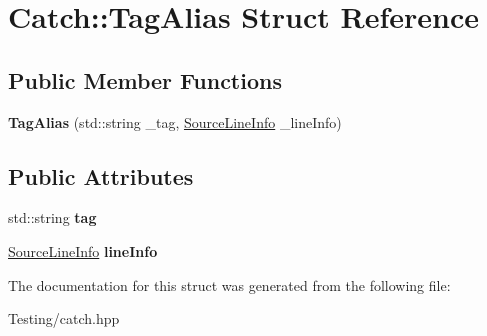 \hypertarget{struct_catch_1_1_tag_alias}{\section{Catch\-:\-:Tag\-Alias Struct Reference}
\label{struct_catch_1_1_tag_alias}
}
\subsection*{Public Member Functions}
\begin{DoxyCompactItemize}
\item 
\hypertarget{struct_catch_1_1_tag_alias_ad9124d03bfb6f767f1c97572330b05bc}{{\bfseries Tag\-Alias} (std\-::string \-\_\-tag, \hyperlink{struct_catch_1_1_source_line_info}{Source\-Line\-Info} \-\_\-line\-Info)}\label{struct_catch_1_1_tag_alias_ad9124d03bfb6f767f1c97572330b05bc}

\end{DoxyCompactItemize}
\subsection*{Public Attributes}
\begin{DoxyCompactItemize}
\item 
\hypertarget{struct_catch_1_1_tag_alias_a950183883ab17c90d0fab16b966b6e2d}{std\-::string {\bfseries tag}}\label{struct_catch_1_1_tag_alias_a950183883ab17c90d0fab16b966b6e2d}

\item 
\hypertarget{struct_catch_1_1_tag_alias_a2f51fe0b3c052561275d26b6eb88f702}{\hyperlink{struct_catch_1_1_source_line_info}{Source\-Line\-Info} {\bfseries line\-Info}}\label{struct_catch_1_1_tag_alias_a2f51fe0b3c052561275d26b6eb88f702}

\end{DoxyCompactItemize}


The documentation for this struct was generated from the following file\-:\begin{DoxyCompactItemize}
\item 
Testing/catch.\-hpp\end{DoxyCompactItemize}

